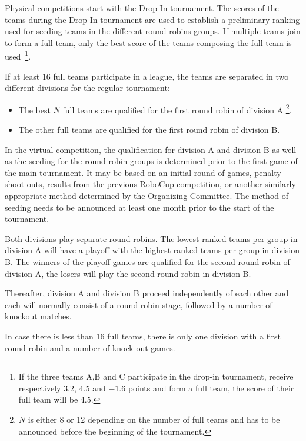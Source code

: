 \bigskip

Physical competitions start with the Drop-In tournament.
  The scores of the teams during the Drop-In tournament are used to
  establish a preliminary ranking used for seeding teams in the different round robins groups.
  If multiple teams join to form a full team,
  only the best score of the teams composing the full team is used~\footnote{%
      If the three teams A,B and C participate in the drop-in tournament,
      receive respectively $3.2$, $4.5$ and $-1.6$ points and
      form a full team,
      the score of their full team will be $4.5$.
  }.

  \bigskip

  If at least 16 full teams participate in a league,
  the teams are separated in two different divisions for the regular tournament:
  \begin{itemize}
  \item The best $N$ full teams are qualified for the first round robin of division A
    \footnote{$N$ is either 8 or 12 depending on the number of full teams and
      has to be announced before the beginning of the tournament.}.
  \item The other full teams are qualified for the first round robin of division B.
  \end{itemize}
  
  In the virtual competition, the qualification for division A and division B as well as the seeding for the round robin groups is determined prior to the first game of the main tournament. It may be based on an initial round of games, penalty shoot-outs, results from the previous RoboCup competition, or another similarly appropriate method determined by the Organizing Committee. The method of seeding needs to be announced at least one month prior to the start of the tournament.

  Both divisions play separate round robins. 
  The lowest ranked teams per group in division A will have a playoff
  with the highest ranked teams per group in division B.
  The winners of the playoff games are qualified for the second round robin of
  division A, the losers will play the second round robin in
  division B.
  
  Thereafter, division A and division B proceed independently of each other and 
  each will normally consist of a round robin stage, followed by a number of knockout matches. 

  
  \bigskip

  In case there is less than 16 full teams, there is only one division with a
  first round robin and a number of knock-out games.

